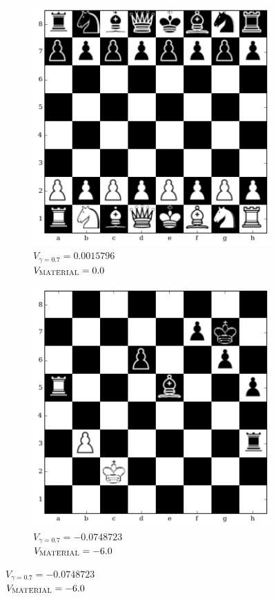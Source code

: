 \begin{figure}[h]
\vspace{-0.2in}
\hspace*{-0.5in}  
  \centering
    \begin{subfigure}[t]{0.45\textwidth}
        \centering
        \includegraphics[scale=0.55]{img/table_evaluations/output_35_0.png}
        \centering
        \caption{$V_{\gamma=0.7} = 0.0015796$\\  
$V_{\textsc{MATERIAL}}= 0.0 $}
  \label{figure:correlation2d}
    \end{subfigure}%
    \hspace{1em}
    \begin{subfigure}[t]{0.45\textwidth}
        \centering
        \includegraphics[scale=0.55]{img/table_evaluations/output_33_0.png}
         \caption{$V_{\gamma=0.7} = -0.0748723$\\  
$V_{\textsc{MATERIAL}}= -6.0 $}
    \end{subfigure}%


\end{figure}
